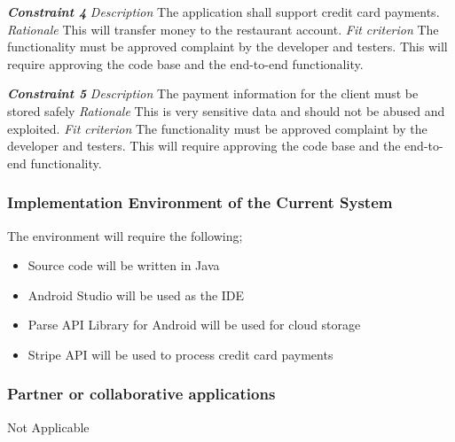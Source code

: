 \documentclass[12pt, titlepage]{article}
\begin{document}
\textbf{\textit{Constraint 4}}
\newline
\textit{Description}\newline
The application shall support credit card payments. \newline\newline
\textit{Rationale}\newline
This will transfer money to the restaurant account. \newline\newline
\textit{Fit criterion}\newline
The functionality must be approved complaint by the developer and testers. This will require approving the code base and the end-to-end functionality.\newline\newline

\textbf{\textit{Constraint 5}}
\newline
\textit{Description}\newline
The payment information for the client must be stored safely \newline\newline
\textit{Rationale}\newline
This is very sensitive data and should not be abused and exploited. \newline\newline
\textit{Fit criterion}\newline
The functionality must be approved complaint by the developer and testers. This will require approving the code base and the end-to-end functionality.\newline\newline

\subsubsection{Implementation Environment of the Current System}
The environment will require the following;
\begin{itemize}
  \item Source code will be written in Java
  \item Android Studio will be used as the IDE
  \item 	Parse API Library for Android will be used for cloud storage
  \item 	Stripe API will be used to process credit card payments
\end{itemize}

\subsubsection{Partner or collaborative applications}
Not Applicable \newline\newline
\end{document}
